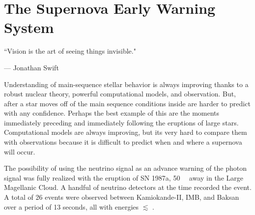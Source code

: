 %
%
%
%


\chapter{The Supernova Early Warning System}
	\label{snews_chapter}
	\vspace{-0.2in}

	\begin{quoting}
		\noindent \large ``Vision is the art of seeing things invisible." \normalsize

		--- Jonathan Swift
	\end{quoting}

	 Understanding of main-sequence stellar behavior is always improving thanks to a robust nuclear theory, powerful computational models, and observation. But, after a star moves off of the main sequence conditions inside are harder to predict with any confidence. Perhaps the best example of this are the moments immediately preceding and immediately following the eruptions of large stars. Computational models are always improving, but its very hard to compare them with observations because it is difficult to predict when and where a supernova will occur. 

	The possibility of using the neutrino signal as an advance warning of the photon signal was fully realized with the eruption of SN 1987a, \SI{50}{\kilo\parsec} away in the Large Magellanic Cloud. A handful of neutrino detectors at the time recorded the event. A total of 26 events were observed between Kamiokande-II, IMB, and Baksan over a period of 13 seconds, all with energies $\lesssim$ \nolinebreak {}\cite{kii1987a,imb_1987a,baksan1987a}.

